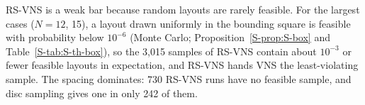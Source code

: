 RS-VNS is a weak bar because random layouts are rarely feasible. For the largest cases ($N=12$, 15), a layout drawn uniformly in the bounding square is feasible with probability below $10^{-6}$ (Monte Carlo; Proposition~\ref{S-prop:S-box} and Table~\ref{S-tab:S-th-box}), so the 3,015 samples of RS-VNS contain about $10^{-3}$ or fewer feasible layouts in expectation, and RS-VNS hands VNS the least-violating sample. The spacing dominates: 730 RS-VNS runs have no feasible sample, and disc sampling gives one in only 242 of them.

